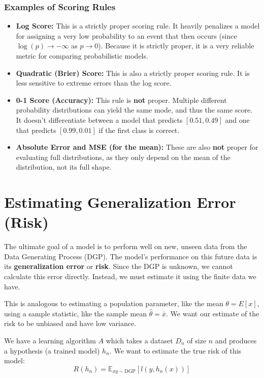 \documentclass{article}
\begin{document}
\begin{multicols}{2}
\subsubsection{Examples of Scoring Rules}
\begin{itemize}
    \item \textbf{Log Score:} This is a strictly proper scoring rule. It heavily penalizes a model for assigning a very low probability to an event that then occurs (since $\log(p) \to -\infty$ as $p \to 0$). Because it is strictly proper, it is a very reliable metric for comparing probabilistic models.
    \item \textbf{Quadratic (Brier) Score:} This is also a strictly proper scoring rule. It is less sensitive to extreme errors than the log score.
    \item \textbf{0-1 Score (Accuracy):} This rule is \textbf{not} proper. Multiple different probability distributions can yield the same mode, and thus the same score. It doesn't differentiate between a model that predicts $[0.51, 0.49]$ and one that predicts $[0.99, 0.01]$ if the first class is correct.
    \item \textbf{Absolute Error and MSE (for the mean):} These are also \textbf{not} proper for evaluating full distributions, as they only depend on the mean of the distribution, not its full shape.
\end{itemize}

\section{Estimating Generalization Error (Risk)}
The ultimate goal of a model is to perform well on new, unseen data from the Data Generating Process (DGP). The model's performance on this future data is its \textbf{generalization error} or \textbf{risk}. Since the DGP is unknown, we cannot calculate this error directly. Instead, we must estimate it using the finite data we have.

This is analogous to estimating a population parameter, like the mean $\theta = E[x]$, using a sample statistic, like the sample mean $\hat{\theta} = \bar{x}$. We want our estimate of the risk to be unbiased and have low variance.

We have a learning algorithm $A$ which takes a dataset $D_n$ of size $n$ and produces a hypothesis (a trained model) $h_n$. We want to estimate the true risk of this model:
$$ R(h_n) = \mathbb{E}_{xy \sim \text{DGP}}[l(y, h_n(x))] $$


\end{multicols}
\end{document}
